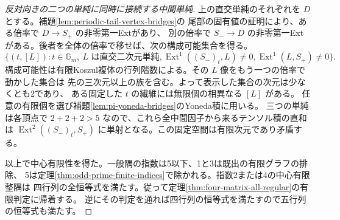 \begin{proof}[反対向きの二つの単純に同時に接続する中間単純]
上の直交単純のそれぞれを $D$ とする。補題\ref{lem:periodic-tail-vertex-bridges}の
尾部の固有値の証明により、ある倍率で $D\to S_+$ の非零第一Extがあり、
別の倍率で $S_-\to D$ の非零第一Extがある。後者を全体の倍率で移せば、次の構成可能集合を得る。
\[
 \{(t,[L]):t\in\mathbb G_m,\ L\text{ は直交二次元単純},       \operatorname{Ext}^1((S_-)_t,L)\ne0,       \operatorname{Ext}^1(L,S_+)\ne0\}.
\]
構成可能性は有限Koszul複体の行列階数による。その $L$ 像をもう一つの倍率で動かした集合は
先の三次元以上の族を含む。よって表示した集合の次元は少なくとも2であり、
ある固定した $t$ の繊維には無限個の相異なる $[L]$ がある。
任意の有限個を選び補題\ref{lem:pi-yoneda-bridges}のYoneda積に用いる。
三つの単純は各頂点で $2+2+2>5$ なので、これら全中間因子から来るテンソル積の直和は
$\operatorname{Ext}^2((S_-)_t,S_+)$ に単射となる。この固定空間は有限次元であり矛盾する。

以上で中心有限性を得た。一般隅の指数は5以下、1と3は既出の有限グラフの排除、
5は定理\ref{thm:odd-prime-finite-indices}で除かれる。指数2または4の中心有限整隅は
四行列の全恒等式を満たす。従って定理\ref{thm:four-matrix-all-regular}の有限判定に帰着する。
逆にその判定を通れば四行列の恒等式を満たすので五行列の恒等式も満たす。
\end{proof}
